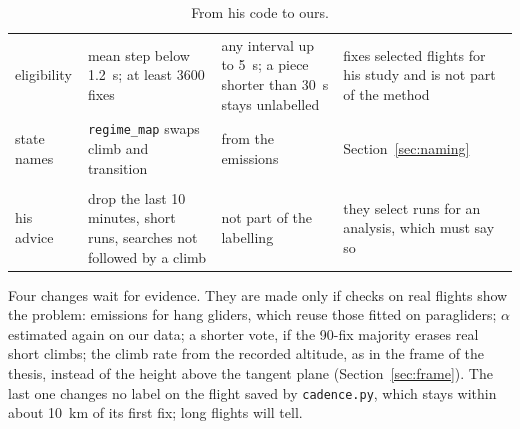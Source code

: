 \begin{table}
\begin{tabularx}{\textwidth}{@{}>{\raggedright}p{2.3cm} >{\raggedright}X >{\raggedright}X >{\raggedright\arraybackslash}p{4.1cm}@{}}
eligibility & mean step below 1.2~s; at least 3600 fixes & any interval up to 5~s; a piece shorter than 30~s stays unlabelled & 3600 fixes selected flights for his study and is not part of the method \\ \addlinespace
state names & \texttt{regime\_map} swaps climb and transition & from the emissions & Section~\ref{sec:naming} \\ \addlinespace
\multicolumn{4}{@{}l}{\textit{left out}} \\
his advice & drop the last 10 minutes, short runs, searches not followed by a climb & not part of the labelling & they select runs for an analysis, which must say so \\
\bottomrule
\end{tabularx}
\caption{From his code to ours.}
\label{tab:keep}
\end{table}

Four changes wait for evidence. They are made only if checks on real flights show the problem:
emissions for hang gliders, which reuse those fitted on paragliders; $\alpha$ estimated again on
our data; a shorter vote, if the 90-fix majority erases real short climbs; the climb rate from
the recorded altitude, as in the frame of the thesis, instead of the height above the tangent
plane (Section~\ref{sec:frame}). The last one changes no label on the flight saved by
\texttt{cadence.py}, which stays within about 10~km of its first fix; long flights will tell.
